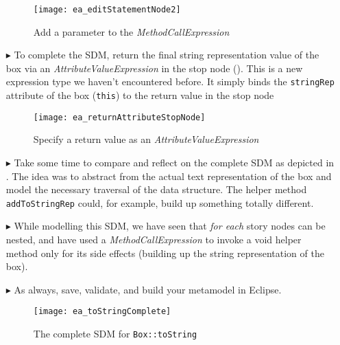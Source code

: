 \begin{itemize}
\begin{figure}[htbp]
\begin{center}
  \texttt{[image: ea\_editStatementNode2]}
  \caption{Add a parameter to the \emph{MethodCallExpression}}
  \label{ea:editStatement2}
\end{center}
\end{figure}

\item[$\blacktriangleright$] To complete the SDM, return the final string representation value of the box via an \emph{AttributeValueExpression} in
the stop node (). This is a new expression type we haven't encountered before. It simply
binds the \texttt{stringRep} attribute of the box (\texttt{this}) to the return value in the stop node


\begin{figure}[htbp]
\begin{center}
  \texttt{[image: ea\_returnAttributeStopNode]}
  \caption{Specify a return value as an \emph{AttributeValueExpression}}
  \label{ea:toStringStopNode}
\end{center}
\end{figure}

\vspace{0.5cm}

\item[$\blacktriangleright$] Take some time to compare and reflect on the complete SDM as depicted in .  The idea was to
abstract from the actual text representation of the box and model the necessary traversal of the data structure. The helper method \texttt{addToStringRep}
could, for example, build up something totally different.

\vspace{0.5cm}

\item[$\blacktriangleright$] While modelling this SDM, we have seen that \emph{for each} story nodes can be nested, and have used a \emph{MethodCallExpression}
to invoke a void helper method only for its side effects (building up the string representation of the box).

\vspace{0.5cm}

\item[$\blacktriangleright$] As always, save, validate, and build your metamodel in Eclipse.

\begin{figure}[htbp]
\begin{center}
  \texttt{[image: ea\_toStringComplete]}
  \caption{The complete SDM for \texttt{Box::toString}}  
  \label{ea:sdm_tostringComplete}
\end{center}
\end{figure}
\FloatBarrier

\end{itemize}
